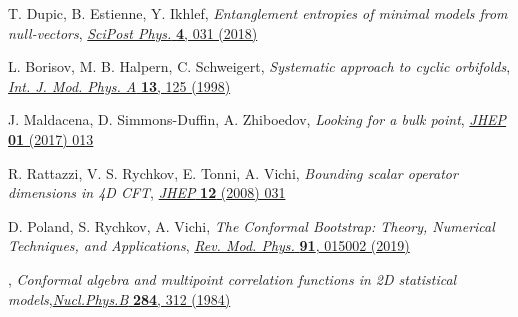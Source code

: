 \documentclass[a4paper,11pt]{article}
\begin{document}
\begin{thebibliography}{99}
 T. Dupic, B. Estienne, Y. Ikhlef, \emph{Entanglement entropies of minimal models from null-vectors}, 
\href{https://scipost.org/10.21468/SciPostPhys.4.6.031}{\emph{SciPost Phys.} {\bf 4}, 031 (2018)}

 L. Borisov, M. B. Halpern, C. Schweigert, \emph{Systematic approach to cyclic orbifolds}, 
\href{https://doi.org/10.1142/S0217751X98000044}{\emph{Int. J. Mod. Phys. A} {\bf 13}, 125 (1998)}

 J. Maldacena, D. Simmons-Duffin, A. Zhiboedov, \emph{Looking for a bulk point},
\href{ https://doi.org/10.1007/JHEP01(2017)013}{\emph{JHEP} {\bf 01} (2017) 013}

 R. Rattazzi, V. S. Rychkov, E. Tonni, A. Vichi, \emph{Bounding scalar operator dimensions in 4D CFT},
\href{https://doi.org/10.1088/1126-6708/2008/12/031}{\emph{JHEP} {\bf 12} (2008) 031}

 D. Poland, S. Rychkov, A. Vichi, \emph{The Conformal Bootstrap: Theory, Numerical Techniques, and Applications},
\href{https://doi.org/10.1103/RevModPhys.91.015002}{\emph{Rev. Mod. Phys.} {\bf 91}, 015002 (2019)}

, \emph{Conformal algebra and multipoint correlation functions in 2D statistical models},\href{https://www.sciencedirect.com/science/article/pii/0550321384902694}{\emph{Nucl.Phys.B} {\bf 284}, 312 (1984)  }




\end{thebibliography}
\end{document}

